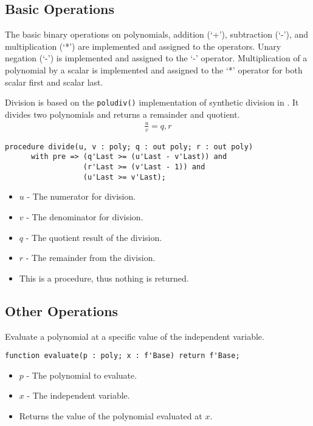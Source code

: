 \documentclass[10pt, openany]{book}
\newcommand{\function}[1]{\texttt{#1}}
\begin{document}
\subsection{Basic Operations}
The basic binary operations on polynomials, addition (`+'), subtraction (`-'), and multiplication (`*') are implemented and assigned to the operators.  Unary negation (`-') is implemented and assigned to the `-' operator.  Multiplication of a polynomial by a scalar is implemented and assigned to the `*' operator for both scalar first and scalar last.

Division is based on the \function{poludiv()} implementation of synthetic division in \cite{NR-C}.  It divides two polynomials and returns a remainder and quotient.
\begin{align*}
  \frac{u}{v} = q, r
\end{align*}
\begin{lstlisting}
procedure divide(u, v : poly; q : out poly; r : out poly)
      with pre => (q'Last >= (u'Last - v'Last)) and
                  (r'Last >= (v'Last - 1)) and
                  (u'Last >= v'Last);
\end{lstlisting}
\begin{itemize}
  \item $u$ - The numerator for division.
  \item $v$ - The denominator for division.
  \item $q$ - The quotient result of the division.
  \item $r$ - The remainder from the division.
  \item This is a procedure, thus nothing is returned.
\end{itemize}

\subsection{Other Operations}

Evaluate a polynomial at a specific value of the independent variable.
\begin{lstlisting}
function evaluate(p : poly; x : f'Base) return f'Base;
\end{lstlisting}
\begin{itemize}
  \item $p$ - The polynomial to evaluate.
  \item $x$ - The independent variable.
  \item Returns the value of the polynomial evaluated at $x$.
\end{itemize}
\end{document}
